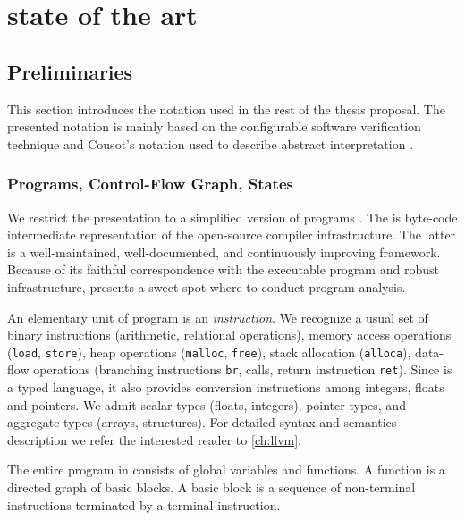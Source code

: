 \chapter{state of the art}
\label{ch:state}


\section{Preliminaries}
\label{sec:preliminaries}

This section introduces the notation used in the rest of the thesis proposal.
The presented notation is mainly based on the configurable software
verification technique \cite{Beyer2007, Beyer2018, Beyer2018b} and Cousot's
notation used to describe abstract interpretation \cite{Cousot2012}.

\subsection{Programs, Control-Flow Graph, States}

We restrict the presentation to a simplified version of \llvmir programs
\cite{Lattner04}. The \llvmir is byte-code intermediate representation of the
open-source \llvm compiler infrastructure.  The latter is a well-main\-tained,
well-documented, and continuously improving framework. Because of its faithful
correspondence with the executable program and robust infrastructure, \llvm
presents a sweet spot where to conduct program analysis.

An elementary unit of \llvm program is an \emph{instruction}. We recognize a usual set of binary
instructions (arithmetic, relational operations), memory access operations
(\texttt{load}, \texttt{store}), heap operations (\texttt{malloc},
\texttt{free}), stack allocation (\texttt{alloca}), data-flow operations
(branching instructions \texttt{br}, calls, return instruction \texttt{ret}).
Since \llvmir is a typed language, it also provides conversion instructions
among integers, floats and pointers. We admit scalar types (floats, integers),
pointer types, and aggregate types (arrays, structures).  For detailed syntax
and semantics description we refer the interested reader to \autoref{ch:llvm}.

The entire program in \llvm consists of global variables and functions.  A
function is a directed graph of basic blocks. A basic block is a sequence of
non-terminal instructions terminated by a terminal instruction.

